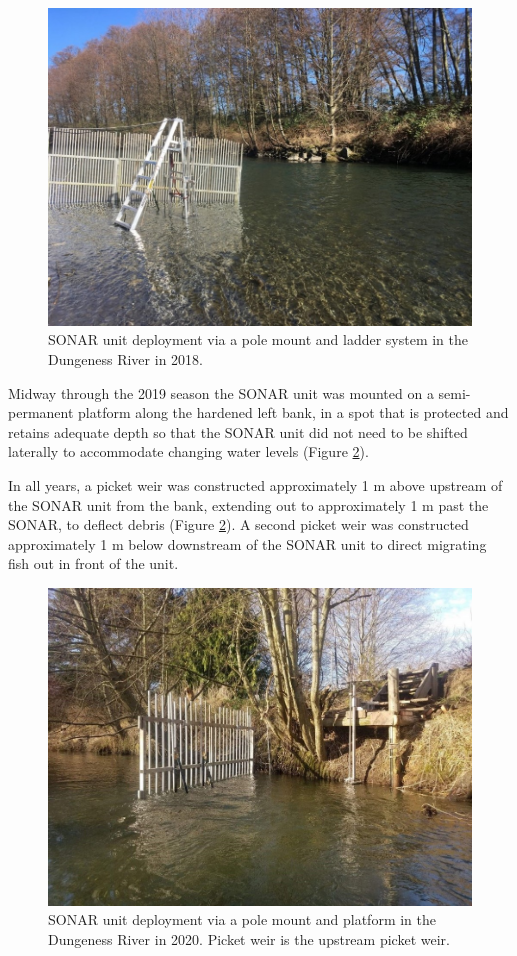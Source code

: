 \documentclass[
]{article}
\begin{document}
\begin{figure}

{\centering \includegraphics[width=0.7\linewidth]{../images/setup_2018} 

}

\caption{SONAR unit deployment via a pole mount and ladder system in the Dungeness River in 2018.}\label{fig:setup-2018}
\end{figure}

Midway through the 2019 season the SONAR unit was mounted on a semi-permanent platform along the hardened left bank, in a spot that is protected and retains adequate depth so that the SONAR unit did not need to be shifted laterally to accommodate changing water levels (Figure \ref{fig:setup-2019}).

In all years, a picket weir was constructed approximately 1 m above upstream of the SONAR unit from the bank, extending out to approximately 1 m past the SONAR, to deflect debris (Figure \ref{fig:setup-2019}). A second picket weir was constructed approximately 1 m below downstream of the SONAR unit to direct migrating fish out in front of the unit.

\begin{figure}

{\centering \includegraphics[width=0.7\linewidth]{../images/setup_2019} 

}

\caption{SONAR unit deployment via a pole mount and platform in the Dungeness River in 2020. Picket weir is the upstream picket weir.}\label{fig:setup-2019}
\end{figure}
\end{document}
